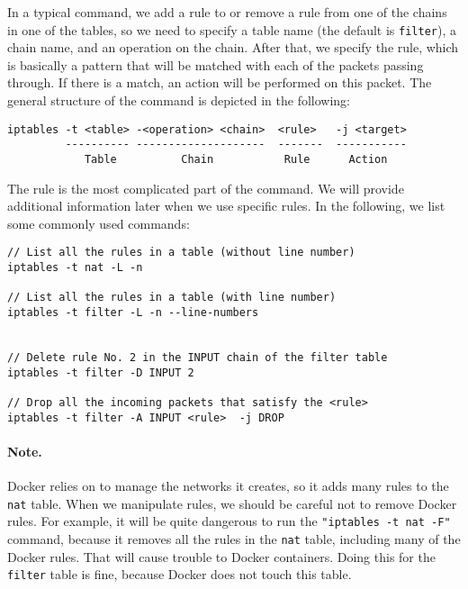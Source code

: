 In a typical \iptables command, we add a rule to or remove a rule 
from one of the chains in one of the tables, so we need to 
specify a table name (the default is \texttt{filter}), a chain name, 
and an operation on the chain. After that, we specify the rule, which
is basically a pattern that will be matched with each of the 
packets passing through. If there is a match, an action will be 
performed on this packet. 
The general structure of the command is depicted in the following:

\begin{lstlisting}
iptables -t <table> -<operation> <chain>  <rule>   -j <target>
         ---------- --------------------  -------  -----------
            Table          Chain           Rule      Action
\end{lstlisting}


The rule is the most complicated part of the \iptables command. 
We will provide additional information later when we use 
specific rules. In the following, we list some commonly 
used commands: 


\begin{lstlisting}
// List all the rules in a table (without line number)
iptables -t nat -L -n

// List all the rules in a table (with line number)
iptables -t filter -L -n --line-numbers


// Delete rule No. 2 in the INPUT chain of the filter table 
iptables -t filter -D INPUT 2

// Drop all the incoming packets that satisfy the <rule>
iptables -t filter -A INPUT <rule>  -j DROP
\end{lstlisting}


\paragraph{Note.} Docker relies on \iptables to manage 
the networks it creates, so it adds many rules to 
the \texttt{nat} table. 
When we manipulate \iptables rules, we should be careful 
not to remove Docker rules. For example, it will be quite
dangerous to run the \texttt{"iptables -t nat -F"} command, because 
it removes all the rules in the \texttt{nat} table,
including many of the Docker rules. That will cause 
trouble to Docker containers. Doing this for 
the \texttt{filter} table is fine, because Docker 
does not touch this table. 


